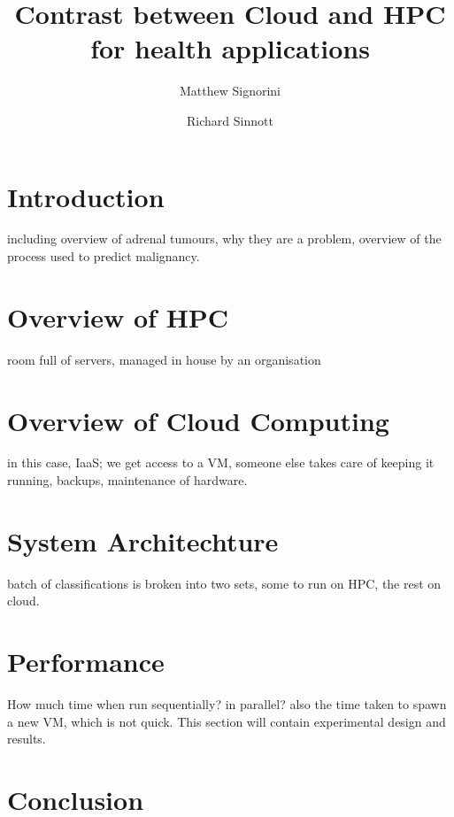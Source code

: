 \documentclass[a4paper]{article}
\title{Contrast between Cloud and HPC for health applications}
\author{Matthew Signorini \and Richard Sinnott}
\begin{document}
\maketitle

\begin{abstract}
    \blindtext
\end{abstract}

\section{Introduction}
including overview of adrenal tumours, why they are a problem, overview of
the process used to predict malignancy.

\section{Overview of HPC}
room full of servers, managed in house by an organisation

\section{Overview of Cloud Computing}
in this case, IaaS; we get access to a VM, someone else takes care of
keeping it running, backups, maintenance of hardware.

\section{System Architechture}
batch of classifications is broken into two sets, some to run on HPC, the 
rest on cloud.

\section{Performance}
How much time when run sequentially? in parallel? also the time taken to
spawn a new VM, which is not quick. This section will contain experimental
design and results.

\section{Conclusion}
\end{document}
